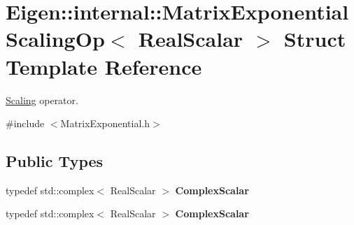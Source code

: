 \hypertarget{struct_eigen_1_1internal_1_1_matrix_exponential_scaling_op}{}\section{Eigen\+:\+:internal\+:\+:Matrix\+Exponential\+Scaling\+Op$<$ Real\+Scalar $>$ Struct Template Reference}
\label{struct_eigen_1_1internal_1_1_matrix_exponential_scaling_op}


\hyperlink{class_scaling}{Scaling} operator.  




{\ttfamily \#include $<$Matrix\+Exponential.\+h$>$}

\subsection*{Public Types}
\begin{DoxyCompactItemize}
\item 
\mbox{\label{struct_eigen_1_1internal_1_1_matrix_exponential_scaling_op_aae910fb4d83e1855d9246c52b5df9b4b}} 
typedef std\+::complex$<$ Real\+Scalar $>$ {\bfseries Complex\+Scalar}
\item 
\mbox{\label{struct_eigen_1_1internal_1_1_matrix_exponential_scaling_op_aae910fb4d83e1855d9246c52b5df9b4b}} 
typedef std\+::complex$<$ Real\+Scalar $>$ {\bfseries Complex\+Scalar}
\end{DoxyCompactItemize}
